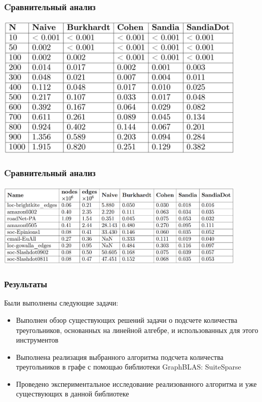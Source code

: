 \documentclass{beamer}
\begin{document}
\begin{frame}
  \transwipe[direction=90]
  \frametitle{Cравнительный анализ}
\includegraphics[width=12cm]{./pictures/t1.png}
\end{frame}

\begin{frame}
  \transwipe[direction=90]
  \frametitle{Cравнительный анализ}
\includegraphics[width=12cm]{./pictures/t2.png}

\end{frame}

\begin{frame}
  \transwipe[direction=90]
  \frametitle{Результаты}
Были выполнены следующие задачи:
\begin{itemize}
    \item Выполнен обзор существующих решений задачи о подсчете количества треугольников, основанных на линейной алгебре, и использованных для этого инструментов
    \item Выполнена реализация выбранного алгоритма подсчета количества треугольников в графе с помощью библиотеки GraphBLAS: SuiteSparse
    \item Проведено экспериментальное исследование реализованного алгоритма и уже существующих в данной библиотеке
\end{itemize}
\end{frame}
\end{document}

